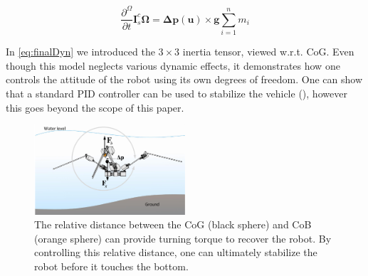 \begin{equation}\label{eq:finalDyn}
\frac{\partial^\Omega}{\partial t}\textbf{I}_s^c\boldsymbol{\Omega}  = {\boldsymbol{\Delta}\textbf{p}}(\textbf{u}) \times \textbf{g}{\sum_{i=1}^n m_i } 
\end{equation}

In \eqref{eq:finalDyn} we introduced the $3 \times 3$ inertia tensor, viewed w.r.t. CoG. Even though this model neglects various dynamic effects, it demonstrates how one controls the attitude of the robot using its own degrees of freedom. One can show that a standard PID controller can be used to stabilize the vehicle (\cite{Haus2017}), however this goes beyond the scope of this paper.

\begin{figure}
	\centering
	\includegraphics[width=0.5\textwidth]{./img/RestoreTorque.pdf}
	\caption{The relative distance between the CoG (black sphere) and CoB (orange sphere) can provide turning torque to recover the robot. By controlling this relative distance, one can ultimately stabilize the robot before it touches the bottom. }
	\label{fig:RestoreTorque}
\end{figure}